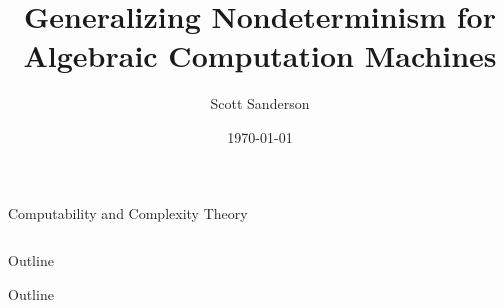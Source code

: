 \documentclass[c]{beamer}
\title{Generalizing Nondeterminism for Algebraic Computation Machines}
\author{Scott Sanderson}
\institute{Department of Mathematics\\Williams College}
\date{\today}
\begin{document}
\theoremstyle{definition}
\newtheorem{proposition}{Proposition}
\newtheorem{proofidea}{Proof Idea}

\begin{frame}
  \titlepage
\end{frame}

\begin{frame}{Computability and Complexity Theory}
  
  \begin{columns}
  \end{columns}

\end{frame}

\begin{frame}{Outline}
  \begin{center}
    \scaletopagewidth{\outlinenobss}
  \end{center}
\end{frame}

\begin{frame}{Outline}
  \begin{center}
    \scaletopagewidth{\outlinenondet}
  \end{center}
\end{frame}
\end{document}
